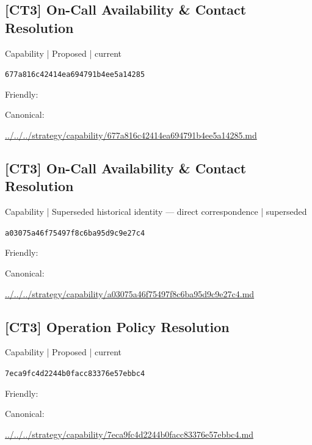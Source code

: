 \documentclass[10pt,a4paper]{article}
\begin{document}
\subsection*{[CT3] On-Call Availability \& Contact Resolution}
{\small Capability | Proposed | current}\par
\texttt{677a816c42414ea694791b4ee5a14285}\par
Friendly: \par
Canonical: \par
{\footnotesize\url{../../../strategy/capability/677a816c42414ea694791b4ee5a14285.md}}\par
\subsection*{[CT3] On-Call Availability \& Contact Resolution}
{\small Capability | Superseded historical identity — direct correspondence | superseded}\par
\texttt{a03075a46f75497f8c6ba95d9c9e27c4}\par
Friendly: \par
Canonical: \par
{\footnotesize\url{../../../strategy/capability/a03075a46f75497f8c6ba95d9c9e27c4.md}}\par
\subsection*{[CT3] Operation Policy Resolution}
{\small Capability | Proposed | current}\par
\texttt{7eca9fc4d2244b0facc83376e57ebbc4}\par
Friendly: \par
Canonical: \par
{\footnotesize\url{../../../strategy/capability/7eca9fc4d2244b0facc83376e57ebbc4.md}}\par
\end{document}
